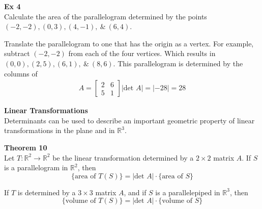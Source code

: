 \documentclass{article}
\begin{document}
  \textbf{Ex 4}\\
  Calculate the area of the parallelogram determined by the points $ (-2,-2), (0,3),(4,-1), ~\&~ (6,4) $. 

  Translate the parallelogram to one that has the origin as a vertex. For example, subtract $ (-2,-2) $ from each of the four vertices. Which results in $ (0,0),(2,5),(6,1), ~\&~ (8,6) $. This parallelogram is determined by the columns of
  \[
    \begin{gathered}
    A= \begin{bmatrix}
      2 &6\\
      5 &1
    \end{bmatrix}
    |\text{det }A|=| -28 |=\boxed{28}
    \end{gathered}
  \]

  \textbf{Linear Transformations}\\
  Determinants can be used to describe an important geometric property of linear transformations in the plane and in $ \mathbb{R}^{3} $.
  
  \textbf{Theorem 10}\\
  Let $ T:\mathbb{R}^{2}\to \mathbb{R}^{2} $ be the linear transformation determined by a $ 2 \times 2 $ matrix $ A $. If $ S $ is a parallelogram in $ \mathbb{R}^{2} $, then
  \[
    \{ \text{area of }T(S) \}=| \text{det }A | \cdot \{ \text{area of }S \}
  \]

  If $ T $ is determined by a $ 3 \times 3 $ matrix $ A $, and if $ S $ is a parallelepiped in $ \mathbb{R}^{3} $, then
  \[
    \{ \text{volume of }T(S) \}=| \text{det }A | \cdot \{ \text{volume of }S \}
  \]
\end{document}
